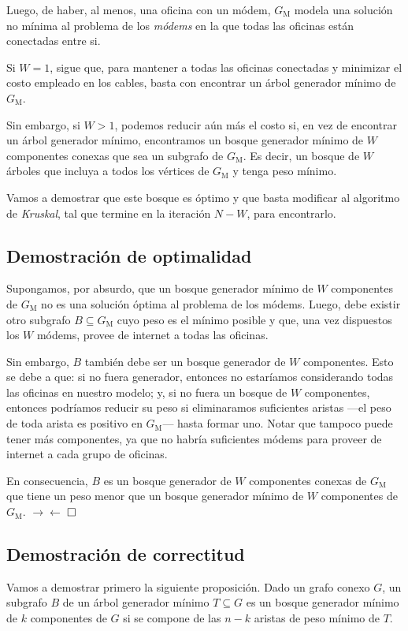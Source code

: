 Luego, de haber, al menos, una oficina con un módem, $G_{\text{M}}$ modela una solución no mínima al problema de los \textit{módems} en la que todas las oficinas están conectadas entre si. 

Si $W = 1$, sigue que, para mantener a todas las oficinas conectadas y minimizar el costo empleado en los cables, basta con encontrar un árbol generador mínimo de $G_{\text{M}}$. 

Sin embargo, si $W > 1$, podemos reducir aún más el costo si, en vez de encontrar un árbol generador mínimo, encontramos un bosque generador mínimo de $W$ componentes conexas que sea un subgrafo de $G_{\text{M}}$. Es decir, un bosque de $W$ árboles que incluya a todos los vértices de $G_{\text{M}}$ y tenga peso mínimo.

Vamos a demostrar que este bosque es óptimo y que basta modificar al algoritmo de \textit{Kruskal}, tal que termine en la iteración $N-W$, para encontrarlo.

\subsection{Demostración de optimalidad}

Supongamos, por absurdo, que un bosque generador mínimo de $W$ componentes de $G_{\text{M}}$ no es una solución óptima al problema de los módems. Luego, debe existir otro subgrafo $B \subseteq G_{\text{M}}$ cuyo peso es el mínimo posible y que, una vez dispuestos los $W$ módems, provee de internet a todas las oficinas. 

Sin embargo, $B$ también debe ser un bosque generador de $W$ componentes. Esto se debe a que: si no fuera generador, entonces no estaríamos considerando todas las oficinas en nuestro modelo; y, si no fuera un bosque de $W$ componentes, entonces podríamos reducir su peso si eliminaramos suficientes aristas ---el peso de toda arista es positivo en $G_{\text{M}}$--- hasta formar uno. Notar que tampoco puede tener más componentes, ya que no habría suficientes módems para proveer de internet a cada grupo de oficinas. 

En consecuencia, $B$ es un bosque generador de $W$ componentes conexas de $G_{\text{M}}$ que tiene un peso menor que un bosque generador mínimo de $W$ componentes  de $G_{\text{M}}$. $\rightarrow\leftarrow$ $\hfill \square$

\subsection{Demostración de correctitud}\label{correctitud} Vamos a demostrar primero la siguiente proposición. Dado un grafo conexo $G$, un subgrafo $B$ de un árbol generador mínimo $T \subseteq G$ es un bosque generador mínimo de $k$ componentes de $G$ si se compone de las $n - k$ aristas de peso mínimo de $T$.

